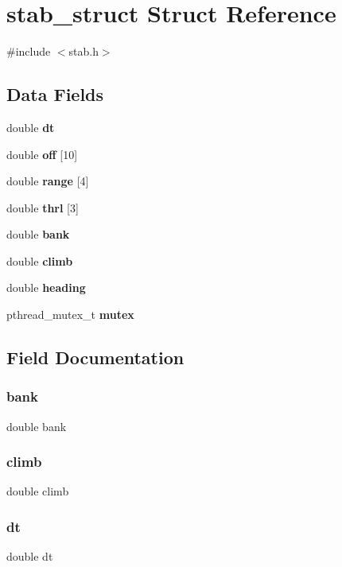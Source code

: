 \section{stab\+\_\+struct Struct Reference}
\label{structstab__struct}


{\ttfamily \#include $<$stab.\+h$>$}

\subsection*{Data Fields}
\begin{DoxyCompactItemize}
\item 
double \textbf{ dt}
\item 
double \textbf{ off} [10]
\item 
double \textbf{ range} [4]
\item 
double \textbf{ thrl} [3]
\item 
double \textbf{ bank}
\item 
double \textbf{ climb}
\item 
double \textbf{ heading}
\item 
pthread\+\_\+mutex\+\_\+t \textbf{ mutex}
\end{DoxyCompactItemize}


\subsection{Field Documentation}
\mbox{\label{structstab__struct_a953479a986931b0314ee1aa6d081b31e}} 
\subsubsection{bank}
{\footnotesize\ttfamily double bank}

\mbox{\label{structstab__struct_a72cbc74638e72ebd02fc3b0bd2cb80af}} 
\subsubsection{climb}
{\footnotesize\ttfamily double climb}

\mbox{\label{structstab__struct_a03e28be41881b703c836edbfe9b51b17}} 
\subsubsection{dt}
{\footnotesize\ttfamily double dt}

